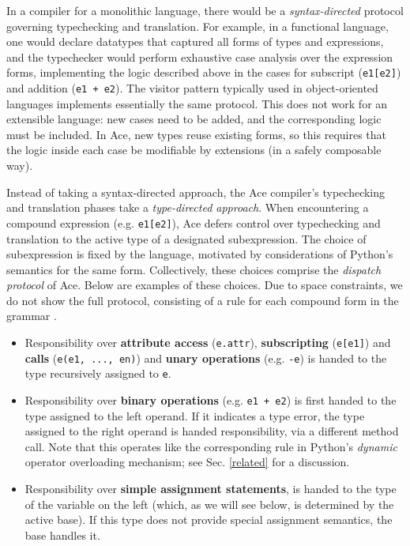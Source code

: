 \documentclass[9pt,preprint]{sigplanconf}
\begin{document}
In a compiler for a monolithic language, there would be a \emph{syntax-directed} protocol governing typechecking and translation. For example, in a functional language, one would declare datatypes that captured all forms of types and expressions, and the typechecker would perform exhaustive case analysis over the expression forms, implementing the logic described above in the cases for subscript (\verb|e1[e2]|) and addition (\verb|e1 + e2|). The visitor pattern typically used in object-oriented languages implements essentially the same protocol. This does not work for an extensible language: new cases need to be added, and the corresponding logic must be included. In Ace, new types reuse existing forms, so this requires that the logic inside each case be modifiable by extensions (in a safely composable way).

Instead of taking a syntax-directed approach, the Ace compiler's typechecking and translation phases take a \emph{type-directed approach}. When encountering a compound expression (e.g. \verb|e1[e2]|), Ace defers control over typechecking and translation to the active type of a designated subexpression. The choice of subexpression is fixed by the language, motivated by considerations of Python's semantics for the same form. Collectively, these choices comprise the \emph{dispatch protocol} of Ace. Below are examples of these choices. Due to space constraints, we do not show the full protocol, consisting of a rule for each compound form in the grammar \cite{pythonast}.
\begin{itemize}
\item Responsibility over {\bf attribute access} (\texttt{e.attr}), {\bf subscripting} (\texttt{e[e1]}) and \textbf{calls} (\verb|e(e1, ..., en)|) and {\bf unary operations} (e.g. \verb|-e|) is handed to the type recursively assigned to \texttt{e}.
\item Responsibility over {\bf binary operations} (e.g. \verb|e1 + e2|) is first handed to the type assigned to the left operand. If it indicates a type error, the type assigned to the right operand is handed responsibility, via a different method call. {Note that this operates like the corresponding rule in Python's \emph{dynamic} operator overloading mechanism; see Sec. \ref{related} for a discussion.}
\item Responsibility over {\bf simple assignment statements}, is handed to the type of the variable on the left (which, as we will see below, is determined by the active base). If this type does not provide special assignment semantics, the base handles it. %
\end{itemize}
\end{document}
